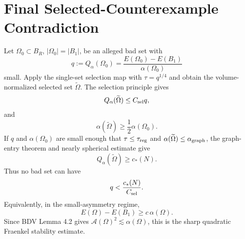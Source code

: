 \documentclass[11pt]{article}
\begin{document}
\section{Final Selected-Counterexample Contradiction}

Let \(\Omega_0\subset B_R\), \(|\Omega_0|=|B_1|\), be an alleged bad set with
\[
q:=Q_\alpha(\Omega_0)
=\frac{E(\Omega_0)-E(B_1)}{\alpha(\Omega_0)}
\]
small. Apply the single-set selection map with \(\tau=q^{1/4}\) and obtain the
volume-normalized selected set \(\widetilde\Omega\). The selection principle
gives
\[
Q_\alpha(\widetilde\Omega)\le C_{\rm sel}q,
\]
and
\[
\alpha(\widetilde\Omega)\ge \frac12\alpha(\Omega_0).
\]
If \(q\) and \(\alpha(\Omega_0)\) are small enough that
\(\tau\le\tau_{\rm reg}\) and
\(\alpha(\widetilde\Omega)\le\alpha_{\rm graph}\), the graph-entry theorem and
nearly spherical estimate give
\[
Q_\alpha(\widetilde\Omega)\ge c_*(N).
\]
Thus no bad set can have
\[
q<\frac{c_*(N)}{C_{\rm sel}}.
\]
Equivalently, in the small-asymmetry regime,
\[
E(\Omega)-E(B_1)\ge c\,\alpha(\Omega).
\]
Since BDV Lemma 4.2 gives \(\mathcal A(\Omega)^2\lesssim \alpha(\Omega)\),
this is the sharp quadratic Fraenkel stability estimate.
\end{document}

